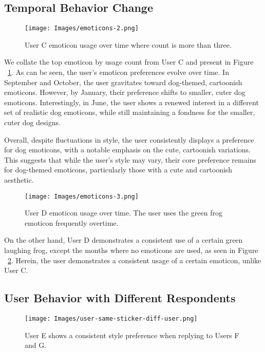\subsection{Temporal Behavior Change}
\begin{figure}[htbp] 
    \centering \texttt{[image: Images/emoticons-2.png]} 
    \caption{User C emoticon usage over time where count is more than three.} 
\label{fig:emoticon-usage-overtime} 
\end{figure}
We collate the top emoticon by usage count from User C and present in Figure ~\ref{fig:emoticon-usage-overtime}. As can be seen, the user's emoticon preferences evolve over time. In September and October, the user gravitates toward dog-themed, cartoonish emoticons. However, by January, their preference shifts to smaller, cuter dog emoticons. Interestingly, in June, the user shows a renewed interest in a different set of realistic dog emoticons, while still maintaining a fondness for the smaller, cuter dog designs.

Overall, despite fluctuations in style, the user consistently displays a preference for dog emoticons, with a notable emphasis on the cute, cartoonish variations. This suggests that while the user's style may vary, their core preference remains for dog-themed emoticons, particularly those with a cute and cartoonish aesthetic.

\begin{figure}[htbp] 
    \centering \texttt{[image: Images/emoticons-3.png]} 
    \caption{User D emoticon usage over time. The user uses the green frog emoticon frequently overtime.} 
\label{fig:emoticon-top-emoticons} 
\end{figure}
On the other hand, User D demonstrates a consistent use of a certain green laughing frog, except the months where no emoticons are used, as seen in Figure ~\ref{fig:emoticon-top-emoticons}. Herein, the user demonstrates a consistent usage of a certain emoticon, unlike User C.

\subsection{User Behavior with Different Respondents}

\begin{figure}[htbp] \centering \texttt{[image: Images/user-same-sticker-diff-user.png]} \caption{User E shows a consistent style preference when replying to Users F and G.} \label{fig:user-same-emoticon-diff-user} \end{figure}

